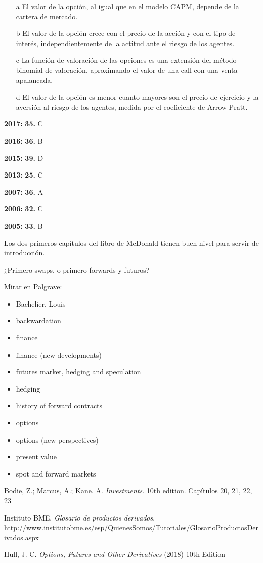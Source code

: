 \documentclass{nuevotema}
\begin{document}
\begin{itemize}
	\item[a] El valor de la opción, al igual que en el modelo CAPM, depende de la cartera de mercado.
	\item[b] El valor de la opción crece con el precio de la acción y con el tipo de interés, independientemente de la actitud ante el riesgo de los agentes.
	\item[c] La función de valoración de las opciones es una extensión del método binomial de valoración, aproximando el valor de una call con una venta apalancada.
	\item[d] El valor de la opción es menor cuanto mayores son el precio de ejercicio y la aversión al riesgo de los agentes, medida por el coeficiente de Arrow-Pratt.
\end{itemize}

\notas

\textbf{2017:} \textbf{35.} C

\textbf{2016:} \textbf{36.} B

\textbf{2015:} \textbf{39.} D

\textbf{2013:} \textbf{25.} C

\textbf{2007:} \textbf{36.} A

\textbf{2006:} \textbf{32.} C

\textbf{2005:} \textbf{33.} B

Los dos primeros capítulos del libro de McDonald tienen buen nivel para servir de introducción.

¿Primero swaps, o primero forwards y futuros?


\bibliografia

Mirar en Palgrave:
\begin{itemize}
	\item Bachelier, Louis
	\item backwardation
    \item finance
    \item finance (new developments)
    \item futures market, hedging and speculation
    \item hedging
    \item history of forward contracts
    \item options
    \item options (new perspectives)
    \item present value
    \item spot and forward markets
\end{itemize}

Bodie, Z.; Marcus, A.; Kane. A. \textit{Investments}. 10th edition. Capítulos 20, 21, 22, 23

Instituto BME. \textit{Glosario de productos derivados}. \url{http://www.institutobme.es/esp/QuienesSomos/Tutoriales/GlosarioProductosDerivados.aspx}

Hull, J. C. \textit{Options, Futures and Other Derivatives} (2018) 10th Edition
\end{document}
